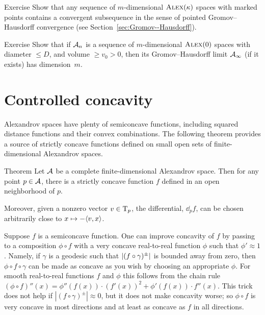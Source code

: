 \begin{thm}{Exercise}\label{ex:diam-compact:GH}
Show that any sequence of $m$-dimensional $\textup{\textsc{Alex}}(\kappa)$ spaces with marked points contains a convergent subsequence in the sense of pointed Gromov--Hausdorff convergence (see Section~\ref{sec:Gromov--Hausdorff}).

\end{thm}

\begin{thm}[!]{Exercise}\label{ex:pack-vol:dim}
Show that if $\mathcal{A}_n$ is a sequence of $m$-dimensional $\textup{\textsc{Alex}}(0)$ spaces with diameter $\le D$, and volume $\ge v_0>0$, then its Gromov--Hausdorff limit $\mathcal{A}_\infty$ (if it exists) has dimension~$m$.
\end{thm}

\section{Controlled concavity}

Alexandrov spaces have plenty of semiconcave functions, including squared distance functions and their convex combinations.
The following theorem provides a source of strictly concave functions defined on small open sets of finite-dimensional Alexandrov spaces.

\begin{thm}{Theorem}
\label{thm:strictly-concave}
Let $\mathcal{A}$ be a complete finite-dimensional Alexandrov space.
Then for any point $p\in \mathcal{A}$, there is a strictly concave function $f$ defined in an
open neighborhood of $p$.

Moreover, given a nonzero vector $v\in \mathrm{T}_p$, the differential, $\dd_p f$, can be chosen
arbitrarily close to $x\mapsto -\langle v,x\rangle$.
\end{thm}

Suppose $f$ is a semiconcave function.
One can improve concavity of $f$ by passing to a composition $\phi\circ f$ with a very concave real-to-real function $\phi$ such that $\phi'\approx 1$.
Namely, if $\gamma$ is a geodesic such that $|(f\z\circ\gamma)^\pm|$ is bounded away from zero, then $\phi\circ f\circ\gamma$ can be made as concave as you wish by choosing an appropriate $\phi$.
For smooth real-to-real functions $f$ and $\phi$ this follows from the chain rule $(\phi\circ f)''(x)=\phi''(f(x))\cdot (f'(x))^2+\phi'(f(x)) \cdot f''(x)$.
This trick does not help if $|(f\circ\gamma)^\pm|\approx 0$, but it does not make concavity worse;
so $\phi\circ f$ is very concave in most directions and at least as concave as $f$ in all directions.

